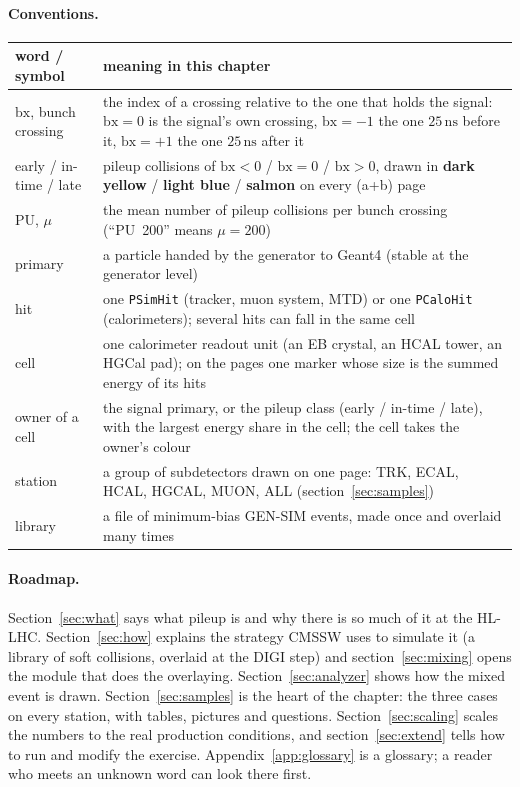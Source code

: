 \documentclass[11pt,a4paper]{article}
\newcommand{\code}[1]{\texttt{#1}}
\newcommand{\bx}{\ensuremath{\mathrm{bx}}}
\newcommand{\ns}{\,\mathrm{ns}}
\begin{document}
\paragraph{Conventions.}
\begin{center}\small
\begin{tabularx}{\textwidth}{>{\raggedright\arraybackslash}p{38mm}X}
\toprule
word / symbol & meaning in this chapter \\
\midrule
$\bx$, bunch crossing & the index of a crossing relative to the one that holds the signal: $\bx=0$ is the
  signal's own crossing, $\bx=-1$ the one $25\ns$ before it, $\bx=+1$ the one $25\ns$ after it \\
early / in-time / late & pileup collisions of $\bx<0$ / $\bx=0$ / $\bx>0$, drawn in
  \textcolor{puearly}{\textbf{dark yellow}} / \textcolor{puintime}{\textbf{light blue}} /
  \textcolor{pulate}{\textbf{salmon}} on every (a+b) page \\
PU, $\mu$ & the mean number of pileup collisions per bunch crossing (``PU~200'' means $\mu=200$) \\
primary & a particle handed by the generator to Geant4 (stable at the generator level) \\
hit & one \code{PSimHit} (tracker, muon system, MTD) or one \code{PCaloHit} (calorimeters); several hits can
  fall in the same cell \\
cell & one calorimeter readout unit (an EB crystal, an HCAL tower, an HGCal pad); on the pages one marker
  whose size is the summed energy of its hits \\
owner of a cell & the signal primary, or the pileup class (early / in-time / late), with the largest energy
  share in the cell; the cell takes the owner's colour \\
station & a group of subdetectors drawn on one page: TRK, ECAL, HCAL, HGCAL, MUON, ALL
  (section~\ref{sec:samples}) \\
library & a file of minimum-bias GEN-SIM events, made once and overlaid many times \\
\bottomrule
\end{tabularx}
\end{center}

\paragraph{Roadmap.} Section~\ref{sec:what} says what pileup is and why there is so much of it at the HL-LHC.
Section~\ref{sec:how} explains the strategy CMSSW uses to simulate it (a library of soft collisions, overlaid
at the DIGI step) and section~\ref{sec:mixing} opens the module that does the overlaying.
Section~\ref{sec:analyzer} shows how the mixed event is drawn. Section~\ref{sec:samples} is the heart of the
chapter: the three cases on every station, with tables, pictures and questions. Section~\ref{sec:scaling}
scales the numbers to the real production conditions, and section~\ref{sec:extend} tells how to run and
modify the exercise. Appendix~\ref{app:glossary} is a glossary; a reader who meets an unknown word can look
there first.
\end{document}
